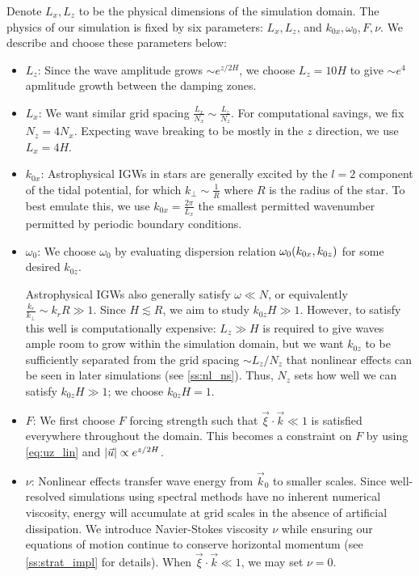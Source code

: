 \documentclass[twocolumn,
        nofootinbib, %
        usenames, %
        aps,
        prd,
        dvipsnames %
    ]{revtex4-1}%
\DeclarePairedDelimiter\abs{\lvert}{\rvert}
\DeclarePairedDelimiter\p{\lparen}{\rparen}
\begin{document}
Denote $L_x, L_z$ to be the physical dimensions of the simulation domain. The
physics of our simulation is fixed by six parameters: $L_x, L_z$, and $k_{0x},
\omega_0, F, \nu$. We describe and choose these parameters below:
\begin{itemize}
    \item $L_z$: Since the wave amplitude grows $\sim e^{z/2H}$, we choose $L_z
        = 10H$ to give $\sim e^4$ apmlitude growth between the damping zones.

    \item $L_x$: We want similar grid spacing $\frac{L_x}{N_x} \sim
        \frac{L_z}{N_z}$. For computational savings, we fix $N_z = 4N_x$.
        Expecting wave breaking to be mostly in the $z$ direction, we use $L_x =
        4H$.

    \item $k_{0x}$: Astrophysical IGWs in stars are generally excited by the $l
        = 2$ component of the tidal potential, for which $k_{\perp} \sim
        \frac{1}{R}$ where $R$ is the radius of the star. To best emulate this,
        we use $k_{0x} = \frac{2\pi}{L_x}$ the smallest permitted wavenumber
        permitted by periodic boundary conditions.

    \item $\omega_0$: We choose $\omega_0$ by evaluating dispersion relation
        $\omega_0\p*{k_{0x}, k_{0z}}$ for some desired $k_{0z}$.

        Astrophysical IGWs also generally satisfy $\omega \ll N$, or
        equivalently $\frac{k_r}{k_{\perp}} \sim k_rR \gg 1$. Since $H \lesssim
        R$, we aim to study $k_{0z}H \gg 1$. However, to satisfy this well is
        computationally expensive: $L_z \gg H$ is required to give waves ample
        room to grow within the simulation domain, but we want $k_{0z}$ to be
        sufficiently separated from the grid spacing $\sim L_z / N_z$ that
        nonlinear effects can be seen in later simulations (see
        \autoref{ss:nl_ns}). Thus, $N_z$ sets how well we can satisfy $k_{0z}H
        \gg 1$; we choose $k_{0z}H = 1$.

    \item $F$: We first choose $F$ forcing strength such that $\vec{\xi} \cdot
        \vec{k} \ll 1$ is satisfied everywhere throughout the domain. This
        becomes a constraint on $F$ by using \autoref{eq:uz_lin} and
        $\abs*{\vec{u}} \propto e^{z/2H}$.

    \item $\nu$: Nonlinear effects transfer wave energy from $\vec{k}_{0}$ to
        smaller scales. Since well-resolved simulations using spectral methods
        have no inherent numerical viscosity, energy will accumulate at grid
        scales in the absence of artificial dissipation. We introduce
        Navier-Stokes viscosity $\nu$ while ensuring our equations of motion
        continue to conserve horizontal momentum (see \autoref{ss:strat_impl}
        for details). When $\vec{\xi} \cdot \vec{k} \ll 1$, we may set $\nu =
        0$.
\end{itemize}
\end{document}

